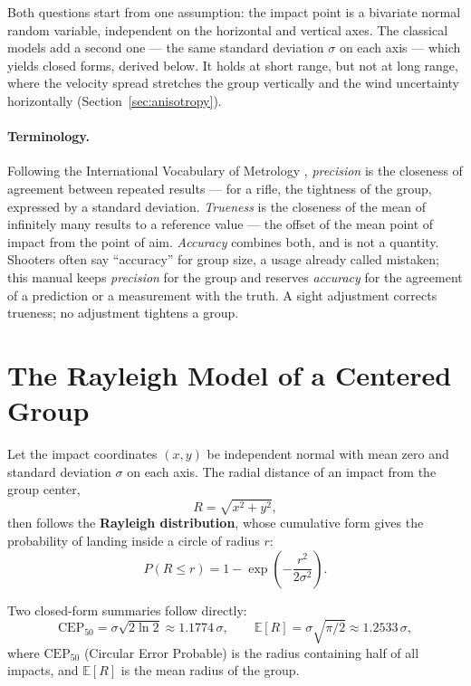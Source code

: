 \documentclass[11pt,twoside,openright]{report}
\begin{document}
Both questions start from one assumption: the impact point is a bivariate normal random variable, independent on the horizontal and vertical axes. The classical models add a second one --- the same standard deviation $\sigma$ on each axis --- which yields closed forms, derived below. It holds at short range, but not at long range, where the velocity spread stretches the group vertically and the wind uncertainty horizontally (Section~\ref{sec:anisotropy}).

\paragraph{Terminology.} Following the International Vocabulary of Metrology \citep[\S\,2.13--2.15]{jcgm2012vim}, \emph{precision} is the closeness of agreement between repeated results --- for a rifle, the tightness of the group, expressed by a standard deviation. \emph{Trueness} is the closeness of the mean of infinitely many results to a reference value --- the offset of the mean point of impact from the point of aim. \emph{Accuracy} combines both, and is not a quantity. Shooters often say ``accuracy'' for group size, a usage \citet{grubbs1991} already called mistaken; this manual keeps \emph{precision} for the group and reserves \emph{accuracy} for the agreement of a prediction or a measurement with the truth. A sight adjustment corrects trueness; no adjustment tightens a group.

\section{The Rayleigh Model of a Centered Group}

Let the impact coordinates $(x, y)$ be independent normal with mean zero and standard deviation $\sigma$ on each axis. The radial distance of an impact from the group center,
\begin{equation}
  R = \sqrt{x^2 + y^2},
\end{equation}
then follows the \textbf{Rayleigh distribution}, whose cumulative form gives the probability of landing inside a circle of radius $r$:
\begin{equation}
  P(R \le r) = 1 - \exp\!\left(-\frac{r^2}{2\sigma^2}\right).
  \label{eq:rayleigh}
\end{equation}

Two closed-form summaries follow directly:
\begin{equation}
  \mathrm{CEP}_{50} = \sigma\sqrt{2\ln 2} \approx 1.1774\,\sigma,
  \qquad
  \mathbb{E}[R] = \sigma\sqrt{\pi/2} \approx 1.2533\,\sigma,
\end{equation}
where $\mathrm{CEP}_{50}$ (Circular Error Probable) is the radius containing half of all impacts, and $\mathbb{E}[R]$ is the mean radius of the group.
\end{document}

